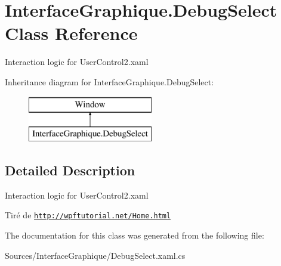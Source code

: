 \hypertarget{class_interface_graphique_1_1_debug_select}{}\section{Interface\+Graphique.\+Debug\+Select Class Reference}
\label{class_interface_graphique_1_1_debug_select}


Interaction logic for User\+Control2.\+xaml  


Inheritance diagram for Interface\+Graphique.\+Debug\+Select\+:\begin{figure}[H]
\begin{center}
\leavevmode
\includegraphics[height=2.000000cm]{class_interface_graphique_1_1_debug_select}
\end{center}
\end{figure}


\subsection{Detailed Description}
Interaction logic for User\+Control2.\+xaml 

Tiré de \href{http://wpftutorial.net/Home.html}{\tt http\+://wpftutorial.\+net/\+Home.\+html} 

The documentation for this class was generated from the following file\+:\begin{DoxyCompactItemize}
\item 
Sources/\+Interface\+Graphique/Debug\+Select.\+xaml.\+cs\end{DoxyCompactItemize}
